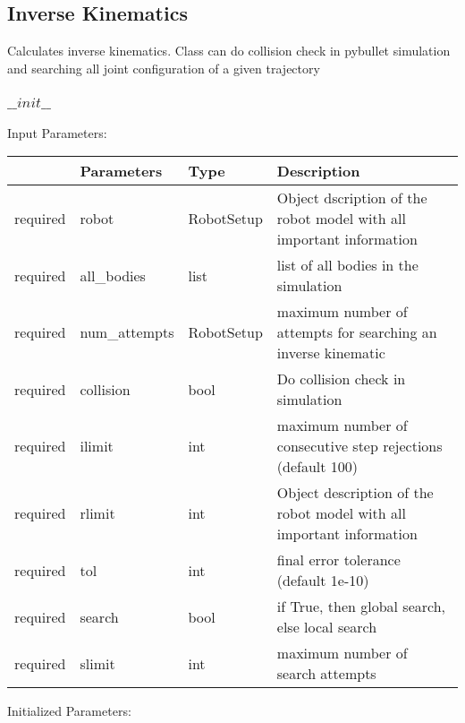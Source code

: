 \documentclass[
	ngerman,
	accentcolor=9c,%
	type=intern,
	marginpar=false
	]{tudapub}
\begin{document}
\subsection{Inverse Kinematics}
\noindent Calculates inverse kinematics. Class can do collision check in pybullet simulation and searching  all joint configuration of a given trajectory

\vspace{0.5cm}
\subsubsection{$\_\_init\_\_$}

\noindent Input Parameters:
\vspace{0.5cm}

\begin{tabular}{|p{}|p{}|p{}| p{}|}
\hline
 & \textbf{Parameters} & \textbf{Type} & \textbf{Description} \\
\hline
required & robot & RobotSetup & Object dscription of the robot model with all important information \\
\hline
required & all\_bodies & list & list of all bodies in the simulation \\
\hline
required & num\_attempts & RobotSetup & maximum number of attempts for searching an inverse kinematic\\
\hline
required & collision & bool & Do collision check in simulation \\
\hline
required & ilimit & int & maximum number of consecutive step rejections (default 100) \\
\hline
required & rlimit & int & Object description of the robot model with all important information \\
\hline
required & tol & int & final error tolerance (default 1e-10) \\
\hline
required & search & bool & if True, then global search, else local search \\
\hline
required & slimit & int & maximum number of search attempts \\
\hline
\end{tabular}
\vspace{0.5cm}

 


\noindent Initialized Parameters:
\end{document}
